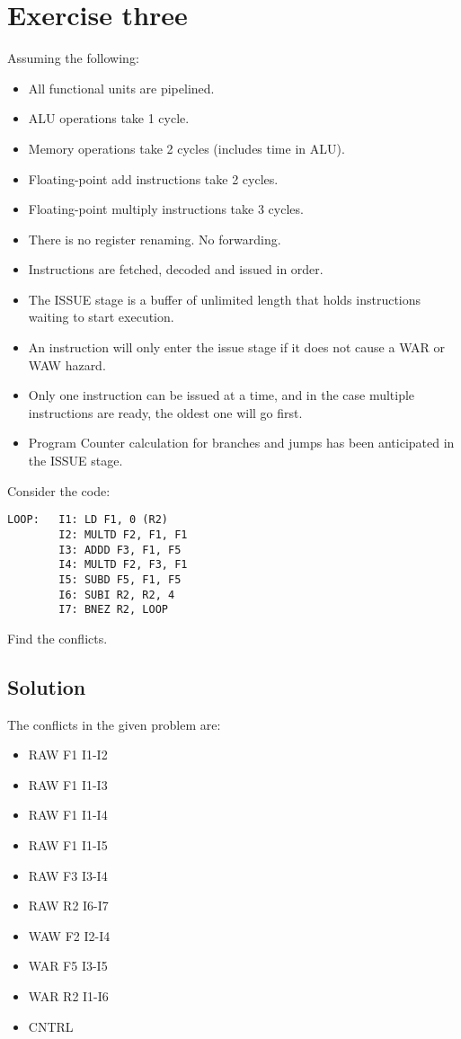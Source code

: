 \section{Exercise three}

Assuming the following:
\begin{itemize}
    \item All functional units are pipelined.
    \item ALU operations take 1 cycle.
    \item Memory operations take 2 cycles (includes time in ALU).
    \item Floating-point add instructions take 2 cycles.
    \item Floating-point multiply instructions take 3 cycles.
    \item There is no register renaming. No forwarding.
    \item Instructions are fetched, decoded and issued in order.
    \item The ISSUE stage is a buffer of unlimited length that holds instructions waiting to start execution.
    \item An instruction will only enter the issue stage if it does not cause a WAR or WAW hazard.
    \item Only one instruction can be issued at a time, and in the case multiple instructions are ready, the oldest one will go first.
    \item Program Counter calculation for branches and jumps has been anticipated in the ISSUE stage.
\end{itemize}
Consider the code:
\begin{verbatim}
LOOP:   I1: LD F1, 0 (R2)
        I2: MULTD F2, F1, F1
        I3: ADDD F3, F1, F5
        I4: MULTD F2, F3, F1
        I5: SUBD F5, F1, F5
        I6: SUBI R2, R2, 4
        I7: BNEZ R2, LOOP
\end{verbatim}
Find the conflicts.

\subsection*{Solution}
The conflicts in the given problem are: 
\begin{itemize}
    \item RAW F1 I1-I2
    \item RAW F1 I1-I3
    \item RAW F1 I1-I4
    \item RAW F1 I1-I5
    \item RAW F3 I3-I4
    \item RAW R2 I6-I7
    \item WAW F2 I2-I4
    \item WAR F5 I3-I5
    \item WAR R2 I1-I6
    \item CNTRL
\end{itemize}